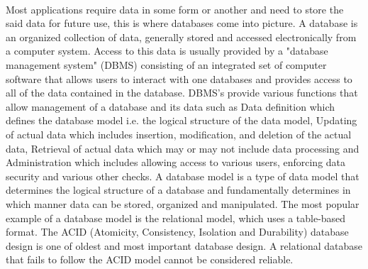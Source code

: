 \documentclass{article}
\begin{document}
        \paragraph{}
        Most applications require data in some form or another and need to store the said data for future use, this is where databases come into picture.
        A database is an organized collection of data, generally stored and accessed electronically from a computer system.
        Access to this data is usually provided by a "database management system" (DBMS) consisting of an integrated set of computer software that allows users to interact with one databases and provides access to all of the data contained in the database.
        DBMS's provide various functions that allow management of a database and its data such as Data definition which defines the database model i.e. the logical structure of the data model, Updating of actual data which includes insertion, modification, and deletion of the actual data, Retrieval of actual data which may or may not include data processing and Administration which includes allowing access to various users, enforcing data security and various other checks.
        \cite{wiki}
        A database model is a type of data model that determines the logical structure of a database and fundamentally determines in which manner data can be stored, organized and manipulated. The most popular example of a database model is the relational model, which uses a table-based format. The ACID (Atomicity, Consistency, Isolation and Durability) database design is one of oldest and most important database design. A relational database that fails to follow the ACID model cannot be considered reliable. 
\end{document}

